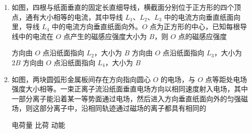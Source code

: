 \documentclass[\gkver]{gaokaozhenti}
\begin{document}
\begin{enumerate}
{	故选 A。
}

\item
如图，四根与纸面垂直的固定长直细导线，横截面分别位于正方形的四个顶点，通有大小相等的电流，其中导线 $L_{1}$、$L_{2}$、$L_{3}$ 中的电流方向垂直纸面向里，导线 $L_{4}$ 中的电流方向垂直纸面向外。$O$ 点为正方形的中心，已知每根导线中的电流在 $O$ 点产生的磁感应强度大小为 $B$，则 $O$ 点的磁感应强度


{方向由 $O$ 点沿纸面指向 $L_{2}$，大小为 $B$}
{方向由 $O$ 点沿纸面指向 $L_{3}$，大小为 $2B$}
{方向由 $O$ 点沿纸面指向 $L_{4}$，大小为 $B$}


\item
如图，两块圆弧形金属板间存在方向指向圆心 $O$ 的电场，与 $O$ 点等距处电场强度大小相等。一束正离子流沿纸面垂直电场方向以相同速度射入电场，其中一部分离子能沿着某一等势面通过电场，然后进入方向垂直纸面向外的匀强磁场，则这部分离子中，沿相同轨迹通过磁场的离子都具有相同的


{电荷量}
{比荷}
{动能}

\end{enumerate}
\end{document}
